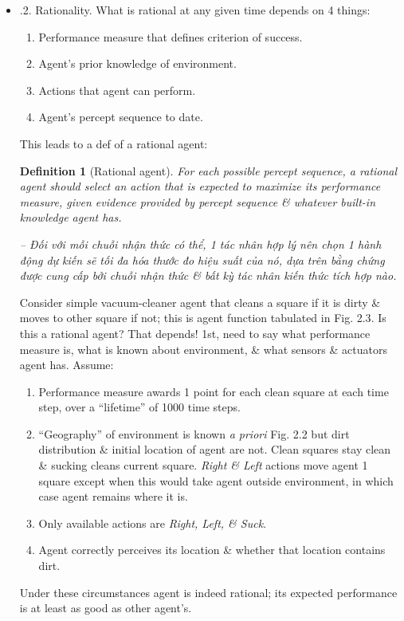\documentclass{article}
\newtheorem{definition}{Definition}
\begin{document}
\begin{itemize}
\begin{itemize}
\begin{itemize}
\begin{itemize}
				For most of book, assume: performance measure can be specified correctly. For reasons given above, however, must accept possibility that we might put wrong purpose into machine -- precisely King Midas problem described on p. 51. Moreover, when designing 1 piece of software, copies of which will belong to different users, cannot anticipate exact preferences of each individual user. Thus, may need to build agents that reflect initial uncertainty about true performance measure \& learn more about it as time goes by; such agents are described in Chaps. 15, 17, 23.
				\item {.2. Rationality.} What is rational at any given time depends on 4 things:
				\begin{enumerate}
					\item Performance measure that defines criterion of success.
					\item Agent's prior knowledge of environment.
					\item Actions that agent can perform.
					\item Agent's percept sequence to date.
				\end{enumerate}
				This leads to a def of a rational agent:
				\begin{definition}[Rational agent]
					For each possible percept sequence, a {\rm rational agent} should select an action that is expected to maximize its performance measure, given evidence provided by percept sequence \& whatever built-in knowledge agent has.

					-- Đối với mỗi chuỗi nhận thức có thể, 1 {\rm tác nhân hợp lý} nên chọn 1 hành động dự kiến sẽ tối đa hóa thước đo hiệu suất của nó, dựa trên bằng chứng được cung cấp bởi chuỗi nhận thức \& bất kỳ tác nhân kiến thức tích hợp nào.
				\end{definition}
				Consider simple vacuum-cleaner agent that cleans a square if it is dirty \& moves to other square if not; this is agent function tabulated in {\sf Fig. 2.3}. Is this a rational agent? That depends! 1st, need to say what performance measure is, what is known about environment, \& what sensors \& actuators agent has. Assume:
				\begin{enumerate}
					\item Performance measure awards 1 point for each clean square at each time step, over a ``lifetime'' of 1000 time steps.
					\item ``Geography'' of environment is known {\it a priori} {\sf Fig. 2.2} but dirt distribution \& initial location of agent are not. Clean squares stay clean \& sucking cleans current square. {\it Right \& Left} actions move agent 1 square except when this would take agent outside environment, in which case agent remains where it is.
					\item Only available actions are {\it Right, Left, \& Suck}.
					\item Agent correctly perceives its location \& whether that location contains dirt.
				\end{enumerate}
				Under these circumstances agent is indeed rational; its expected performance is at least as good as other agent's.


\end{itemize}
\end{itemize}
\end{itemize}
\end{itemize}
\end{document}
